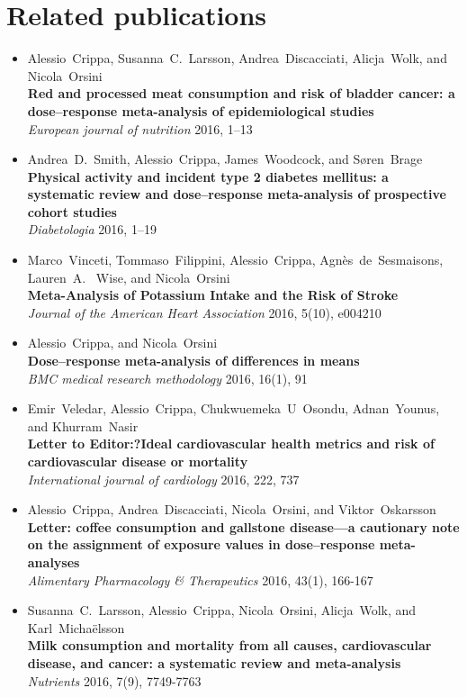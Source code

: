 \documentclass[11pt,a4paper,twoside,openany]{book}\usepackage{knitr}
\begin{document}
{\chapter*{Related publications}
\begin{itemize}
\item Alessio~Crippa, Susanna~C.~Larsson, Andrea~Discacciati, Alicja~Wolk, and Nicola~Orsini \\ \textbf{Red and processed meat consumption and risk of bladder cancer: a dose--response meta-analysis of epidemiological studies} \\ \textit{European journal of nutrition} 2016, 1--13
\item Andrea~D.~Smith, Alessio~Crippa, James~Woodcock, and S{\o}ren~Brage \\ \textbf{Physical activity and incident type 2 diabetes mellitus: a systematic review and dose--response meta-analysis of prospective cohort studies} \\ \textit{Diabetologia} 2016, 1--19
\item Marco~Vinceti, Tommaso~Filippini, Alessio~Crippa, Agn{\`e}s~de~Sesmaisons, Lauren~A.~ Wise, and Nicola~Orsini \\ \textbf{Meta-Analysis of Potassium Intake and the Risk of Stroke} \\ \textit{Journal of the American Heart Association} 2016, 5(10), e004210
\item Alessio~Crippa, and Nicola~Orsini \\ \textbf{Dose--response meta-analysis of differences in means} \\ \textit{BMC medical research methodology} 2016, 16(1), 91
\item Emir~Veledar, Alessio~Crippa, Chukwuemeka~U~Osondu, Adnan~Younus, and Khurram~Nasir \\ \textbf{Letter to Editor:?Ideal cardiovascular health metrics and risk of cardiovascular disease or mortality} \\ \textit{International journal of cardiology} 2016, 222, 737
\item Alessio~Crippa, Andrea~Discacciati, Nicola~Orsini, and Viktor~Oskarsson \\ \textbf{Letter: coffee consumption and gallstone disease---a cautionary note on the assignment of exposure values in dose--response meta-analyses} \\ \textit{Alimentary Pharmacology \& Therapeutics} 2016, 43(1), 166-167
\item Susanna~C.~Larsson, Alessio~Crippa, Nicola~Orsini, Alicja~Wolk, and Karl~Micha{\"e}lsson \\ \textbf{Milk consumption and mortality from all causes, cardiovascular disease, and cancer: a systematic review and meta-analysis} \\ \textit{Nutrients} 2016, 7(9), 7749-7763

\end{itemize}}
\end{document}
